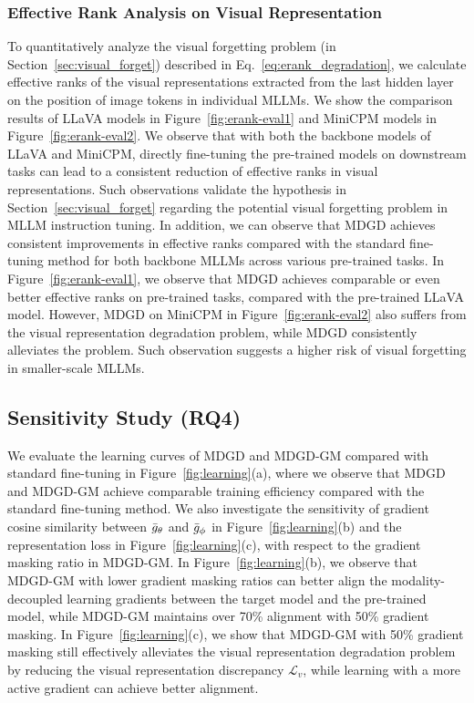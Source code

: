 \subsubsection{Effective Rank Analysis on Visual Representation}
To quantitatively analyze the visual forgetting problem (in Section~\ref{sec:visual_forget}) described in Eq.~\eqref{eq:erank_degradation},
we calculate effective ranks of the visual representations extracted from the last hidden layer on the position of image tokens in individual MLLMs.
We show the comparison results of LLaVA models in Figure~\ref{fig:erank-eval1} and MiniCPM models in Figure~\ref{fig:erank-eval2}.
We observe that with both the backbone models of LLaVA and MiniCPM, 
directly fine-tuning the pre-trained models on downstream tasks can lead to a consistent reduction of effective ranks in visual representations.
Such observations validate the hypothesis in Section~\ref{sec:visual_forget} regarding the potential visual forgetting problem in MLLM instruction tuning.
In addition, we can observe that MDGD achieves consistent improvements in effective ranks compared with the standard fine-tuning method for both backbone MLLMs across various pre-trained tasks.
In Figure~\ref{fig:erank-eval1}, we observe that MDGD achieves comparable or even better effective ranks on pre-trained tasks, compared with the pre-trained LLaVA model.
However, MDGD on MiniCPM in Figure~\ref{fig:erank-eval2} also suffers from the visual representation degradation problem, while MDGD consistently alleviates the problem.
Such observation suggests a higher risk of visual forgetting in smaller-scale MLLMs.



\subsection{Sensitivity Study (RQ4)}
We evaluate the learning curves of MDGD and MDGD-GM compared with standard fine-tuning in Figure~\ref{fig:learning}(a),
where we observe that MDGD and MDGD-GM achieve comparable training efficiency compared with the standard fine-tuning method.
We also investigate the sensitivity of gradient cosine similarity between $\Bar{g}_\theta$ and $\Bar{g}_\phi$ in Figure~\ref{fig:learning}(b) and the representation loss in Figure~\ref{fig:learning}(c),
with respect to the gradient masking ratio in MDGD-GM.
In Figure~\ref{fig:learning}(b), we observe that MDGD-GM with lower gradient masking ratios can better align the modality-decoupled learning gradients between the target model and the pre-trained model,
while MDGD-GM maintains over 70\% alignment with 50\% gradient masking.
In Figure~\ref{fig:learning}(c), we show that MDGD-GM with 50\% gradient masking still effectively alleviates the visual representation degradation problem by reducing the visual representation discrepancy $\mathcal{L}_v$,
while learning with a more active gradient can achieve better alignment.
